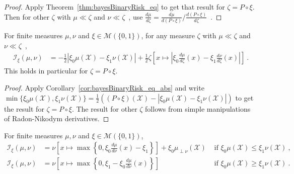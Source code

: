 \begin{proof}\leanok
{}
Apply Theorem~\ref{thm:bayesBinaryRisk_eq} to get that result for $\zeta = P \circ \xi$. Then for other $\zeta$ with $\mu \ll \zeta$ and $\nu \ll \zeta$~, use $\frac{d \mu}{d\zeta} = \frac{d \mu}{d(P \circ \xi)} / \frac{d (P \circ \xi)}{d\zeta}$~.
\end{proof}


\begin{lemma}
  \label{lem:statInfo_eq_integral_abs_sub}
  \leanok
  For finite measures $\mu, \nu$ and $\xi \in \mathcal M(\{0,1\})$, for any measure $\zeta$ with $\mu \ll \zeta$ and $\nu \ll \zeta$~,
  \begin{align*}
  \mathcal I_\xi(\mu, \nu)
  &= - \frac{1}{2} \left\vert \xi_0\mu(\mathcal X) - \xi_1\nu(\mathcal X) \right\vert + 
  \frac{1}{2} \zeta\left[x \mapsto \left\vert \xi_0\frac{d \mu}{d\zeta}(x) - \xi_1\frac{d \nu}{d\zeta}(x)\right\vert\right] 
  \: .
  \end{align*}
  This holds in particular for $\zeta = P \circ \xi$.
\end{lemma}

\begin{proof}%
{}
Apply Corollary~\ref{cor:bayesBinaryRisk_eq_abs} and write $\min\{\xi_0\mu(\mathcal X), \xi_1\nu(\mathcal X)\} = \frac{1}{2}\left((P \circ \xi)(\mathcal X) - \left\vert \xi_0\mu(\mathcal X) - \xi_1\nu(\mathcal X) \right\vert \right)$ to get the result for $\zeta = P \circ \xi$.
The result for other $\zeta$ follows from simple manipulations of Radon-Nikodym derivatives.
\end{proof}


\begin{theorem}
  \label{thm:statInfo_eq_integral}
  \leanok
  For finite measures $\mu, \nu$ and $\xi \in \mathcal M(\{0,1\})$,
  \begin{align*}
  \mathcal I_\xi(\mu, \nu)
  &= \nu\left[ x \mapsto \max \left\{0 , \xi_0\frac{d \mu}{d\nu}(x) - \xi_1 \right\} \right] + \xi_0 \mu_{\perp \nu}(\mathcal X) & \text{ if } \xi_0 \mu(\mathcal X) \le \xi_1 \nu(\mathcal X)
  \: , \\
  \mathcal I_\xi(\mu, \nu)
  &= \nu\left[ x \mapsto \max \left\{0 , \xi_1 - \xi_0\frac{d \mu}{d\nu}(x) \right\} \right] & \text{ if } \xi_0 \mu(\mathcal X) \ge \xi_1 \nu(\mathcal X)
  \: .
  \end{align*}
  
\end{theorem}

